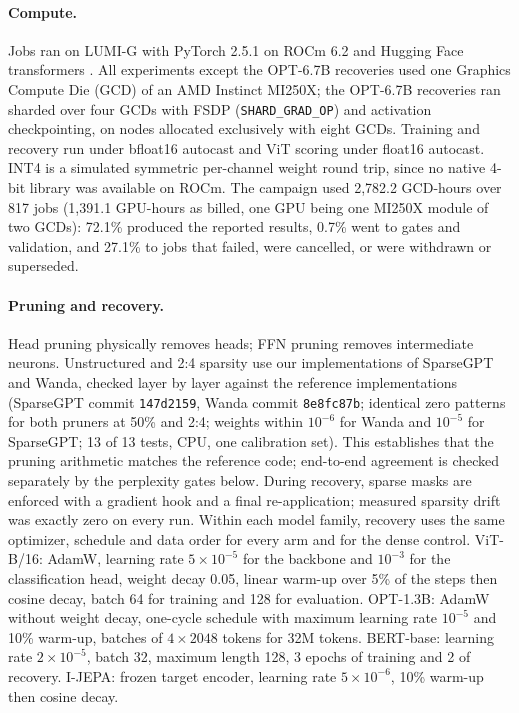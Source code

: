 \documentclass[11pt,a4paper]{article}
\begin{document}
\paragraph{Compute.} Jobs ran on LUMI-G with PyTorch 2.5.1 on ROCm 6.2 \cite{paszke2019pytorch} and Hugging Face transformers \cite{wolf2020transformers}. All experiments except the OPT-6.7B recoveries used one Graphics Compute Die (GCD) of an AMD Instinct MI250X; the OPT-6.7B recoveries ran sharded over four GCDs with FSDP (\texttt{SHARD\_\allowbreak GRAD\_\allowbreak OP}) and activation checkpointing, on nodes allocated exclusively with eight GCDs. Training and recovery run under bfloat16 autocast and ViT scoring under float16 autocast. INT4 is a simulated symmetric per-channel weight round trip, since no native 4-bit library was available on ROCm. The campaign used 2{,}782.2 GCD-hours over 817 jobs (1{,}391.1 GPU-hours as billed, one GPU being one MI250X module of two GCDs): 72.1\% produced the reported results, 0.7\% went to gates and validation, and 27.1\% to jobs that failed, were cancelled, or were withdrawn or superseded.

\paragraph{Pruning and recovery.} Head pruning physically removes heads; FFN pruning removes intermediate neurons. Unstructured and 2:4 sparsity use our implementations of SparseGPT and Wanda, checked layer by layer against the reference implementations (SparseGPT commit \texttt{147d2159}, Wanda commit \texttt{8e8fc87b}; identical zero patterns for both pruners at 50\% and 2:4; weights within $10^{-6}$ for Wanda and $10^{-5}$ for SparseGPT; 13 of 13 tests, CPU, one calibration set). This establishes that the pruning arithmetic matches the reference code; end-to-end agreement is checked separately by the perplexity gates below. During recovery, sparse masks are enforced with a gradient hook and a final re-application; measured sparsity drift was exactly zero on every run. Within each model family, recovery uses the same optimizer, schedule and data order for every arm and for the dense control. ViT-B/16: AdamW, learning rate $5\times10^{-5}$ for the backbone and $10^{-3}$ for the classification head, weight decay 0.05, linear warm-up over 5\% of the steps then cosine decay, batch 64 for training and 128 for evaluation. OPT-1.3B: AdamW without weight decay, one-cycle schedule with maximum learning rate $10^{-5}$ and 10\% warm-up, batches of $4\times2048$ tokens for 32M tokens. BERT-base: learning rate $2\times10^{-5}$, batch 32, maximum length 128, 3 epochs of training and 2 of recovery. I-JEPA: frozen target encoder, learning rate $5\times10^{-6}$, 10\% warm-up then cosine decay.
\end{document}
